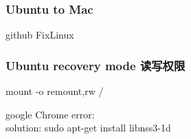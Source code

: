 \documentclass{beamer}
\begin{document}
\begin{CJK}{UTF8}{gkai}
    \begin{frame}\frametitle{Ubuntu to Mac}
        github FixLinux 
    \end{frame}

    \begin{frame}\frametitle{Ubuntu recovery mode 读写权限}
        mount -o remount,rw /
    \end{frame}

    \begin{frame}
        google Chrome error: \\
        solution: sudo apt-get install libnss3-1d
    \end{frame}

\end{CJK}
\end{document}
